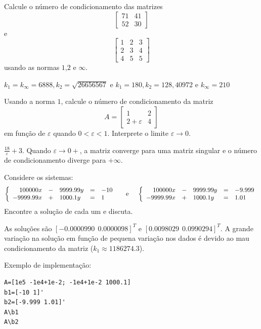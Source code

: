 \begin{Exercise} Calcule o número de condicionamento das matrizes
$$\left[
\begin{array}{cc}
71 & 41\\
52 & 30
\end{array}\right]$$
e
$$\left[
\begin{array}{ccc}
1 & 2 & 3\\
2 & 3 & 4\\
4 & 5 & 5
\end{array}\right]$$
usando as normas $1$,$2$ e $\infty$.
\end{Exercise}
\begin{Answer}
  \begin{tiny}
$k_1=k_\infty=6888, k_2=\sqrt{26656567}$ e $k_1=180, k_2= 128,40972  $ e $k_\infty=210$    
  \end{tiny}
\end{Answer}

\begin{Exercise}Usando a norma $1$, calcule o número de condicionamento da matriz
$$A=\left[
\begin{array}{cc}
1 & 2\\
2+\varepsilon & 4
\end{array}\right]$$
em função de $\varepsilon$ quando $0<\varepsilon<1$. Interprete o limite $\varepsilon\to 0$.
\end{Exercise}
\begin{Answer}
  \begin{tiny}
 $\frac{18}{\varepsilon}+3$. Quando $\varepsilon\to 0+$, a matriz converge para uma matriz singular e o número de condicionamento diverge para $+\infty$.    
  \end{tiny}
\end{Answer}

\begin{Exercise} Considere os sistemas:
$$
\left\{
\begin{array}{rclcl}
100000 x  &-& 9999.99 y  &=&-10\\
-9999.99 x &+&  1000.1 y &=&1
\end{array}\right. ~~~~\hbox{e}~~~~
\left\{
\begin{array}{rclcl}
100000 x  &-& 9999.99 y  &=&-9.999\\
-9999.99 x &+&  1000.1 y &=&1.01
\end{array}\right.
$$
Encontre a solução de cada um e discuta.
\end{Exercise}
\begin{Answer}
  \begin{tiny}
As soluções são $[-0.0000990 ~~ 0.0000098]^T$ e $[0.0098029 ~~ 0.0990294]^T$. A grande variação na solução em função de pequena variação nos dados é devido ao mau condicionamento da matriz ($k_1\approx 1186274.3 $).

Exemplo de implementação:
\begin{verbatim}
A=[1e5 -1e4+1e-2; -1e4+1e-2 1000.1]
b1=[-10 1]'
b2=[-9.999 1.01]'
A\b1
A\b2
\end{verbatim}    
  \end{tiny}
\end{Answer}

